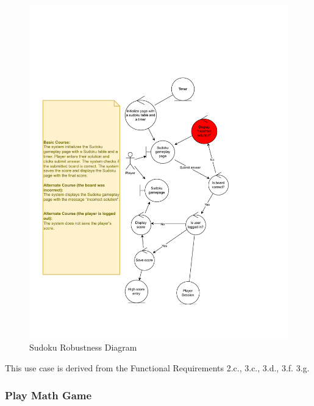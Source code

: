 \documentclass[11pt,a4paper]{article}
\begin{document}
\begin{figure}[H]
    \centering
    \includegraphics[width=1\textwidth,keepaspectratio]{PSI_3rd_trial/robustness/sudoku.drawio.pdf}
    \caption{Sudoku Robustness Diagram}
    \label{fig:sudoku_diagram}
\end{figure}


This use case is derived from the Functional Requirements 2.c., 3.c., 3.d., 3.f. 3.g.

\subsubsection{Play Math Game}
\end{document}
